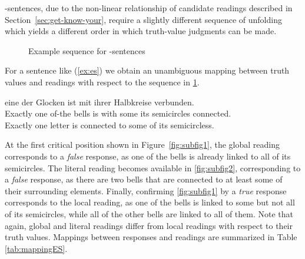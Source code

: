 \documentclass[fleqn,reqno,10pt,draft]{article}
\renewcommand{\es}{\acro{es}}
\begin{document}
\es-sentences, due to the non-linear relationship of candidate
readings described in Section~\ref{sec:get-know-your}, require a
slightly different sequence of unfolding which yields a different
order in which truth-value judgments can be made.
%
\begin{figure}[ht]
	\centering
	\caption[]{Example sequence for \es-sentences}
	\label{fig:exseqES}
\end{figure}
%
For a sentence like (\ref{ex:es}) we obtain an unambiguous
mapping between truth values and readings with respect to the sequence
in \ref{fig:exseqES}.
\begin{exe}
\ex \label{ex:es} \gll {} eine der Glocken ist mit
   ihrer Halbkreise verbunden.\\ 
  Exactly one of-the bells is with some its semicircles connected.\\
  \trans Exactly one letter is connected to some of its semicircless.
\end{exe}
At the first critical position shown in Figure~\ref{fig:subfig1}, the
global reading corresponds to a \emph{false} response, as one of the
bells is already linked to all of its semicircles. The literal reading
becomes available in \ref{fig:subfig2}, corresponding to a
\emph{false} response, as there are two bells that are connected to at
least some of their surrounding elements. Finally, confirming
\ref{fig:subfig1} by a \emph{true} response corresponds to the local
reading, as one of the bells is linked to some but not all of its
semicircles, while all of the other bells are linked to all of
them. Note that again, global and literal readings differ from local
readings with respect to their truth values. Mappings between
responses and readings are summarized in Table \ref{tab:mappingES}.
\end{document}
